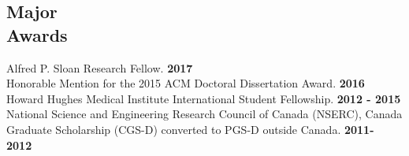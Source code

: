\documentclass[margin,line,letterpaper]{resume}
\begin{document}
\begin{resume}
\begin{small}
    \section{\mysidestyle Major \\Awards}
    Alfred P. Sloan Research Fellow.\hfill \textbf{ 2017}\\
    Honorable Mention for the 2015 ACM Doctoral Dissertation Award.\hfill \textbf{ 2016}\\
     Howard Hughes Medical Institute International Student Fellowship. \hfill \textbf{2012 - 2015}
     \\ National Science and Engineering Research Council of Canada (NSERC), 
     Canada Graduate Scholarship (CGS-D) converted to PGS-D outside Canada. \hfill \textbf{2011- 2012} 
     
%    
%    
    

\end{small}
\end{resume}
\end{document}
